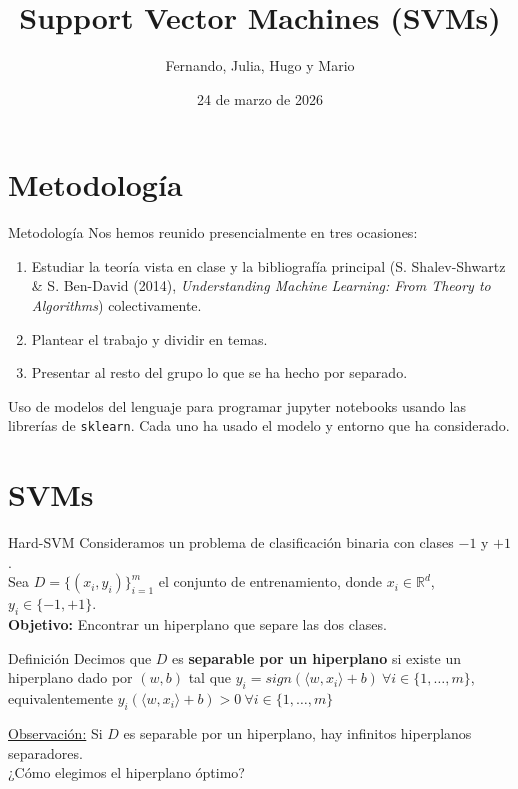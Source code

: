 \documentclass{beamer}
\title[SVM]{Support Vector Machines (SVMs)}
\author{Fernando, Julia, Hugo y Mario}
\institute{UAM}
\date{24 de marzo de 2026}
\begin{document}
\begin{frame}
  \titlepage
\end{frame}


\section{Metodología}
\begin{frame}{Metodología}
    Nos hemos reunido presencialmente en tres ocasiones:
    \begin{enumerate}
        \item Estudiar la teoría vista en clase y la bibliografía principal (S. Shalev-Shwartz \& S. Ben-David (2014), \textit{Understanding Machine Learning: From Theory to Algorithms}) colectivamente.
        \item Plantear el trabajo y dividir en temas.
        \item Presentar al resto del grupo lo que se ha hecho por separado.
    \end{enumerate}

    \vspace{0.5cm}
    Uso de modelos del lenguaje para programar jupyter notebooks usando las librerías de \texttt{sklearn}. Cada uno ha usado el modelo y entorno que ha considerado.
\end{frame}


\section{SVMs}
\begin{frame}{Hard-SVM}
Consideramos un problema de clasificación binaria con clases $-1$ y $+1$.\\
\vspace{0.25cm}
Sea $D=\{(x_i, y_i)\}_{i=1}^m$ el conjunto de entrenamiento, donde $x_i \in \mathbb{R}^d$, $y_i \in \{-1, +1\}$.\\
\vspace{0.25cm}
\textbf{Objetivo:} Encontrar un hiperplano que separe las dos clases.\\
\vspace{0.25cm}
\begin{block}{Definición}
Decimos que $D$ es \textbf{separable por un hiperplano} si existe un hiperplano dado por $(w, b)$ tal que $y_i = sign(\langle w,x_i\rangle +b) \ \forall i \in \{1, \dots, m\}$, equivalentemente $y_i(\langle w,x_i\rangle +b) > 0 \ \forall i \in \{1, \dots, m\}$
\end{block}
\vspace{0.25cm}
\underline{Observación:} Si $D$ es separable por un hiperplano, hay infinitos hiperplanos separadores.\\
\vspace{0.25cm}
¿Cómo elegimos el hiperplano óptimo?
\end{frame}
\end{document}
